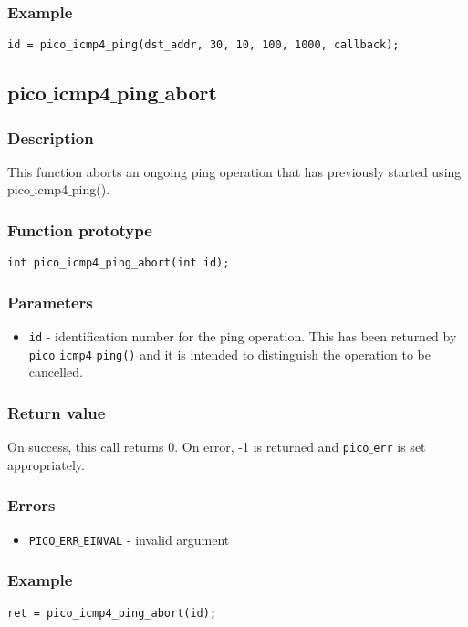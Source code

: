 \subsubsection*{Example}
\begin{verbatim}
id = pico_icmp4_ping(dst_addr, 30, 10, 100, 1000, callback);
\end{verbatim}


\subsection{pico$\_$icmp4$\_$ping$\_$abort}

\subsubsection*{Description}
This function aborts an ongoing ping operation that has previously started using pico$\_$icmp4$\_$ping().

\subsubsection*{Function prototype}
\begin{verbatim}
int pico_icmp4_ping_abort(int id);
\end{verbatim}

\subsubsection*{Parameters}
\begin{itemize}[noitemsep]
    \item \texttt{id} - identification number for the ping operation. This has been returned by \texttt{pico$\_$icmp4$\_$ping()} and it is intended to distinguish the operation to be cancelled.
\end{itemize}

\subsubsection*{Return value}
On success, this call returns 0. 
On error, -1 is returned and \texttt{pico$\_$err} is set appropriately.

\subsubsection*{Errors}
\begin{itemize}[noitemsep]
\item \texttt{PICO$\_$ERR$\_$EINVAL} - invalid argument
\end{itemize}

\subsubsection*{Example}
\begin{verbatim}
ret = pico_icmp4_ping_abort(id);
\end{verbatim}

